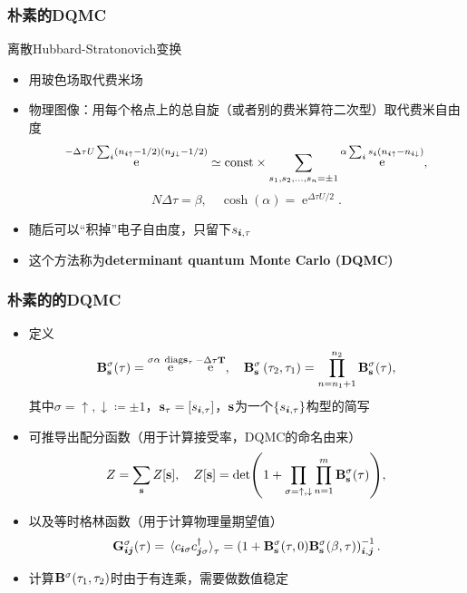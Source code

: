 \documentclass[UTF8]{ctexbeamer}
\DeclareMathOperator{\ee}{e}
\newcommand{\concept}[1]{\textbf{#1}}
\begin{document}
\begin{frame}
\frametitle{朴素的DQMC}

离散Hubbard-Stratonovich变换
\begin{itemize}
    \item 用玻色场取代费米场
    \item 物理图像：用每个格点上的总自旋（或者别的费米算符二次型）取代费米自由度
    \begin{equation}
        \ee^{-\Delta \tau U \sum_{\vb*{i}} (n_{\vb*{i} \uparrow} - 1/2) (n_{\vb*{j} \downarrow} - 1/2)} \simeq \text{const} \times \sum_{s_1, s_2, \ldots, s_n = \pm 1} \ee^{\alpha \sum_{\vb*{i}} s_{\vb*{i}} ({n}_{\vb*{i} \uparrow} - {n}_{\vb*{i} \downarrow})},
    \end{equation}
    \begin{equation}
        N \Delta \tau = \beta, \quad \cosh(\alpha) = \ee^{\Delta \tau U / 2}.
    \end{equation}
    \item 随后可以“积掉”电子自由度，只留下$s_{\vb*{i}, \tau}$
    \item 这个方法称为\concept{determinant quantum Monte Carlo (DQMC)}
\end{itemize}

\end{frame}

\begin{frame}
\frametitle{朴素的的DQMC}

\begin{itemize}
    \item 定义
    \begin{equation}
        \vb{B}^{\sigma}_{\vb{s}}(\tau) = \ee^{\sigma \alpha \ \mathrm{diag}{\vb{s}_\tau}} \ee^{- \Delta \tau \vb{T}}, \quad \mathbf{B}^\sigma_{\mathbf{s}}\left(\tau_{2}, \tau_{1}\right)=\prod_{n=n_{1}+1}^{n_{2}} \vb{B}^{\sigma}_{\vb{s}}(\tau), 
    \end{equation}
    其中$\sigma = \uparrow, \downarrow \coloneqq \pm 1$，$\vb{s}_{\tau} = [s_{\vb*{i}, \tau}]$，$\vb{s}$为一个$\{s_{\vb*{i}, \tau}\}$构型的简写
    \item 可推导出配分函数（用于计算接受率，DQMC的命名由来）
    \begin{equation}
        Z = \sum_{\vb{s}} Z[\vb{s}], \quad Z[\vb{s}] = \det(1 + \prod_{\sigma=\uparrow, \downarrow} \prod_{n=1}^m \vb{B}_{\vb{s}}^\sigma(\tau) ),
    \end{equation}
    \item 以及等时格林函数（用于计算物理量期望值）
    \begin{equation}
        \vb{G}^\sigma_{\vb*{i} \vb*{j}}(\tau) = \expval*{c_{\vb*{i} \sigma} c^\dagger_{\vb*{j} \sigma}}_\tau = \left(1+\mathbf{B}^\sigma_{\mathbf{s}}(\tau, 0) \mathbf{B}^\sigma_{\mathbf{s}}(\beta, \tau)\right)^{-1}_{\vb*{i}, \vb*{j}}.
    \end{equation}
    \item 计算$\vb{B}^\sigma(\tau_1, \tau_2)$时由于有连乘，需要做数值稳定
\end{itemize}

\end{frame}
\end{document}
